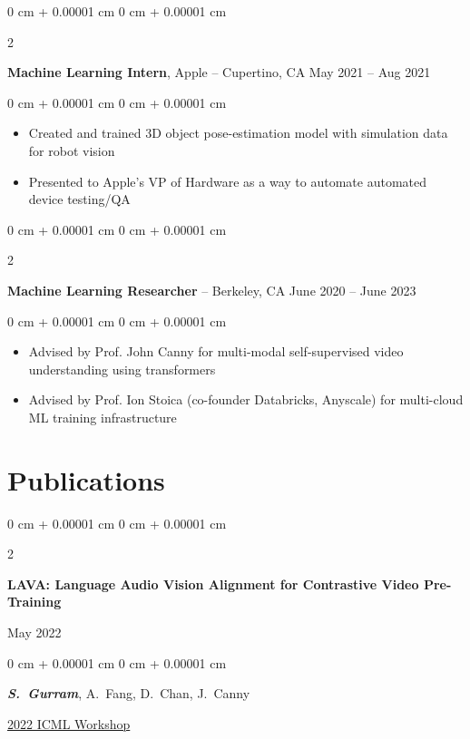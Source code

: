 \documentclass[10pt, letterpaper]{article}
\newenvironment{highlights}{
    \begin{itemize}[
        topsep=0.10 cm,
        parsep=0.10 cm,
        partopsep=0pt,
        itemsep=0pt,
        leftmargin=0 cm + 10pt
    ]
}{
    \end{itemize}
} %
\newenvironment{onecolentry}{
    \begin{adjustwidth}{
        0 cm + 0.00001 cm
    }{
        0 cm + 0.00001 cm
    }
}{
    \end{adjustwidth}
} %
\newenvironment{twocolentry}[2][]{
    \onecolentry
    \def\secondColumn{#2}
    \setcolumnwidth{\fill, 4.5 cm}
    \begin{paracol}{2}
}{
    \switchcolumn \raggedleft \secondColumn
    \end{paracol}
    \endonecolentry
} %
\begin{document}
        \vspace{0.2 cm}

        \begin{twocolentry}{
            May 2021 – Aug 2021
        }
            \textbf{Machine Learning Intern}, Apple -- Cupertino, CA\end{twocolentry}

        \vspace{0.10 cm}
        \begin{onecolentry}
            \begin{highlights}
                \item Created and trained 3D object pose-estimation model with simulation data for robot vision
                \item Presented to Apple's VP of Hardware as a way to automate automated device testing/QA
            \end{highlights}
        \end{onecolentry}

        \vspace{0.2 cm}

        \begin{twocolentry}{
            June 2020 – June 2023
        }
            \textbf{Machine Learning Researcher} -- Berkeley, CA\end{twocolentry}

        \vspace{0.10 cm}
        \begin{onecolentry}
            \begin{highlights}
                \item Advised by Prof. John Canny for multi-modal self-supervised video understanding using transformers
                \item Advised by Prof. Ion Stoica (co-founder Databricks, Anyscale) for multi-cloud ML training infrastructure
            \end{highlights}
        \end{onecolentry}

    
    \section{Publications}
        \begin{samepage}
            \begin{twocolentry}{
                May 2022
            }
                \textbf{LAVA: Language Audio Vision Alignment for Contrastive Video Pre-Training}
            \end{twocolentry}

            \vspace{0.10 cm}
            
            \begin{onecolentry}
                \mbox{\textbf{\textit{S. Gurram}}}, \mbox{A. Fang}, \mbox{D. Chan}, \mbox{J. Canny}
                \vspace{0.10 cm}
                
        \href{https://arxiv.org/abs/2207.08024}{2022 ICML Workshop}
        \end{onecolentry}
        \end{samepage}
\end{document}
